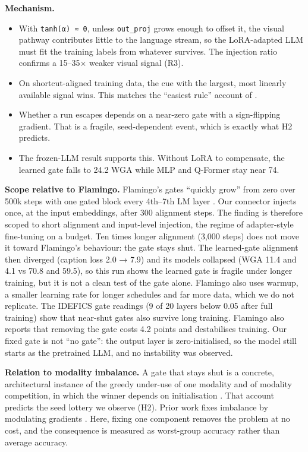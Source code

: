 \textbf{Mechanism.}

\begin{itemize}
\item
  With \texttt{tanh(α)\ ≈\ 0}, unless \texttt{out\_proj} grows enough to offset it, the visual pathway contributes little to
  the language stream, so the LoRA-adapted LLM must fit the training labels from whatever survives. The
  injection ratio confirms a 15--35× weaker visual signal (R3).
\item
  On shortcut-aligned training data, the cue with the largest, most linearly available signal wins. This
  matches the ``easiest rule'' account of \cite{geirhos2020shortcut}.
\item
  Whether a run escapes depends on a near-zero gate with a sign-flipping gradient. That is a fragile,
  seed-dependent event, which is exactly what H2 predicts.
\item
  The frozen-LLM result supports this. Without LoRA to compensate, the learned gate falls to 24.2 WGA while
  MLP and Q-Former stay near 74.
\end{itemize}

\textbf{Scope relative to Flamingo.} Flamingo's gates ``quickly grow'' from zero over 500k steps with one gated block
every 4th--7th LM layer \cite{alayrac2022flamingo}. Our connector injects once, at the input embeddings, after 300
alignment steps. The finding is therefore scoped to short alignment and input-level injection, the regime of
adapter-style fine-tuning on a budget. Ten times longer alignment (3,000 steps) does not move it toward
Flamingo's behaviour: the gate stays shut. The learned-gate alignment then diverged (caption loss 2.0 → 7.9)
and its models collapsed (WGA 11.4 and 4.1 vs 70.8 and 59.5), so this run shows the learned gate is fragile
under longer training, but it is not a clean test of the gate alone. Flamingo also uses warmup, a smaller
learning rate for longer schedules and far more data, which we do not replicate. The IDEFICS gate
readings (9 of 20 layers below 0.05 after full training) show that near-shut gates also survive long training.
Flamingo also reports that removing the gate costs 4.2 points and destabilises training. Our fixed gate is not
``no gate'': the output layer is zero-initialised, so the model still starts as the pretrained LLM, and no
instability was observed.

\textbf{Relation to modality imbalance.} A gate that stays shut is a concrete, architectural instance of the
greedy under-use of one modality \cite{wu2022greedy} and of modality competition, in which the winner depends on
initialisation \cite{huang2022modality}. That account predicts the seed lottery we observe (H2). Prior work fixes
imbalance by modulating gradients \cite{peng2022balanced,wei2025onthefly}. Here, fixing one component removes the
problem at no cost, and the consequence is measured as worst-group accuracy rather than average accuracy.


